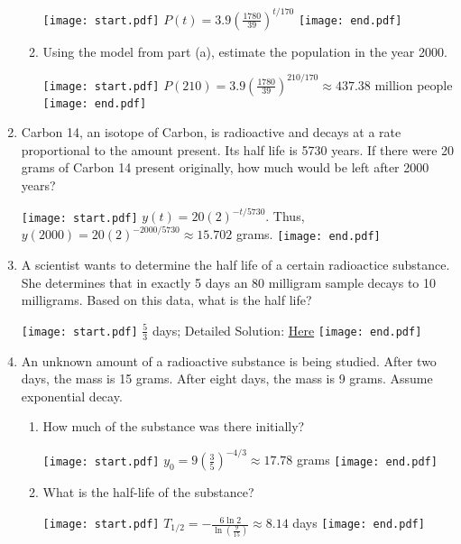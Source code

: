 \documentclass[12pt]{article}
\begin{document}
\begin{enumerate}
\begin{enumerate}
\texttt{[image: start.pdf]}
{{$P(t)=3.9\left(\frac{1780}{39}\right)^{t/170}$}}
\texttt{[image: end.pdf]}


\item Using the model from part (a), estimate the population in the year 2000.

\texttt{[image: start.pdf]}
{{$P(210) = 3.9 \left( \frac{1780}{39} \right)^{210/170} \approx437.38$ million people}}
\texttt{[image: end.pdf]}


\end{enumerate}

\item Carbon 14, an isotope of Carbon, is radioactive and decays at a rate proportional to the amount present.  Its half life is 5730 years.  If there were 20 grams of Carbon 14 present originally, how much would be left after 2000 years?

\texttt{[image: start.pdf]}
{{$y(t)=20(2)^{-t/5730}$.  Thus, $y(2000)=20(2)^{-2000/5730}\approx 15.702$ grams.}}
\texttt{[image: end.pdf]}


\item A scientist wants to determine the half life of a certain radioactice substance.  She determines that in exactly 5 days an 80 milligram sample decays to 10 milligrams.  Based on this data, what is the half life?

\texttt{[image: start.pdf]}
{{$\frac{5}{3}$ days; Detailed Solution: \textcolor{blue}{\href{http://www.math.drexel.edu/classes/Calculus/resources/Math123HW/Solutions/123_02_Modeling_07.pdf}{Here}}}}
\texttt{[image: end.pdf]}
 

\item An unknown amount of a radioactive substance is being studied.  After two days, the mass is 15 grams.  After eight days, the mass is 9 grams.  Assume exponential decay.

\begin{enumerate}

\item How much of the substance was there initially?

\texttt{[image: start.pdf]}
{{$y_0 = 9\left(\frac{3}{5}\right)^{-4/3}\approx 17.78$ grams}}
\texttt{[image: end.pdf]}


\item What is the half-life of the substance?

\texttt{[image: start.pdf]}
{{$T_{1/2}=-\frac{6\ln{2}}{\ln{\left(\frac{9}{15}\right)}}\approx 8.14$ days}}
\texttt{[image: end.pdf]}



\end{enumerate}
\end{enumerate}
\end{document}
